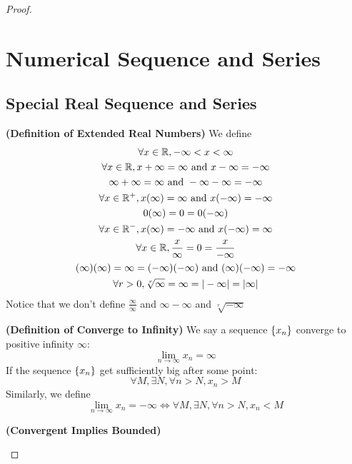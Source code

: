 \documentclass{report}
\begin{document}
\begin{proof}
\chapter{Numerical Sequence and Series}
\section{Special Real Sequence and Series}
\begin{definition}
\label{4.1.1}
\textbf{(Definition of Extended Real Numbers)} We define
\begin{gather}
\forall x\in\mathbb{R}, -\infty <x<\infty\\
\forall x\in\mathbb{R}, x+\infty=\infty \text{ and }x-\infty=-\infty\\
\infty+\infty=\infty \text{ and }-\infty-\infty=-\infty\\
\forall x\in\mathbb{R}^+, x(\infty)=\infty \text{ and }x(-\infty)=-\infty\\
0(\infty)=0=0(-\infty)\\
\forall x\in\mathbb{R}^-, x(\infty)=-\infty\text{ and }x(-\infty)=\infty\\
\forall x\in\mathbb{R}, \frac{x}{\infty}=0=\frac{x}{-\infty}\\
  (\infty)(\infty)=\infty=(-\infty)(-\infty)\text{ and }(\infty)(-\infty)=-\infty\\
  \forall r>0, \sqrt[r]{\infty}=\infty=|-\infty|= |\infty|
\end{gather}
Notice that we don't define  $\frac{\infty}{\infty}$ and $\infty-\infty$ and $\sqrt[r]{-\infty} $
\end{definition}
\begin{definition}
\label{4.1.2}
\textbf{(Definition of Converge to Infinity)} We say a sequence $\{ x_n \}$ converge to positive infinity $\infty$:
\begin{equation}
\lim_{n\to\infty} x_n=\infty
\end{equation}
If the sequence $\{ x_n \}$ get sufficiently big after some point:
 \begin{equation}
\forall M, \exists N, \forall n>N, x_n>M
\end{equation}
Similarly, we define
\begin{equation}
\lim_{n\to\infty}x_n=-\infty\iff \forall M, \exists N, \forall n>N, x_n<M
\end{equation}
\end{definition}
\begin{theorem}
\label{4.1.3}
\textbf{(Convergent Implies Bounded)} 
\begin{equation}

\end{equation}
\end{theorem}
\end{proof}
\end{document}
